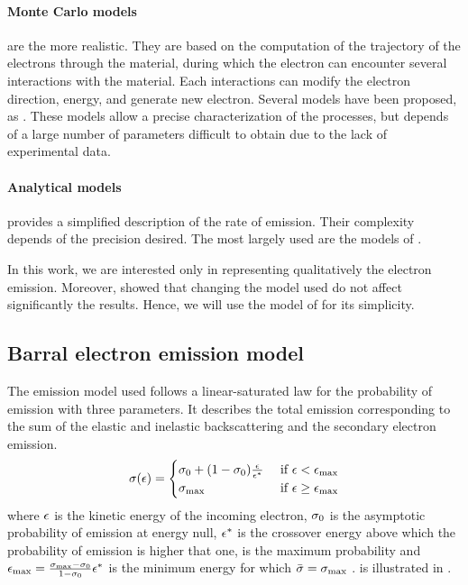 \paragraph{Monte Carlo models} are the more realistic.
 They are based on the computation of the trajectory of the electrons through the material, during which the electron can encounter several interactions with the material.
 Each interactions can modify the electron direction, energy, and generate new electron.
 Several models have been proposed, as \citet{furman2002,pierron2017}.
 These models allow a precise characterization of the processes, but depends of a large number of parameters difficult to obtain due to the lack of experimental data.
 
\paragraph{Analytical models} provides a simplified description of the rate of emission.
Their complexity depends of the precision desired.
The most largely used are the models of \citet{vaughan1989,barral2003a,sydorenko2006b}.

In this work, we are interested only in representing qualitatively the electron emission.
Moreover, \citet{croes2017} showed that changing the model used do not affect significantly the results. 
Hence, we will use the model of \citet{barral2003a} for its simplicity.

\subsection{Barral electron emission model}
\label{sec-modelused}

The emission model used follows a linear-saturated law for the probability of emission with three parameters. 
It describes the total emission corresponding to the sum of the elastic and inelastic backscattering and the secondary electron emission.
\begin{equation} \label{eq-proba_barral}
  \sigma (\epsilon) = 
  \begin{cases}
    \sigma _0 + (1 - \sigma _0) \frac{\epsilon}{\epsilon^{*}}   &\text{ if } \epsilon <  \epsilon_{\max} \\
    \sigma _{\rm max}  &\text{ if } \epsilon \geq \epsilon_{\max}
  \end{cases}
\end{equation}
where $\epsilon$ is the kinetic energy of the incoming electron, $\sigma _0$ is the asymptotic probability of emission at energy null, $\epsilon^{*}$ is the crossover energy above which the probability of emission is higher that one, \probamax is the maximum probability and $\epsilon_{\max}= \frac{\sigma _{\rm max}  - \sigma _0}{1 - \sigma _0} \epsilon^{*} $ is the minimum energy for which $ \bar{\sigma } = \sigma _{\rm max} $ .
 is illustrated in .

